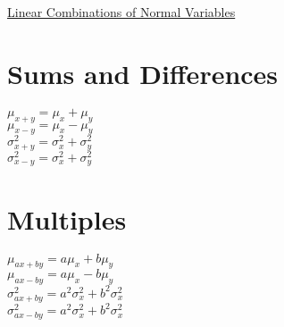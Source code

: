 \documentclass{article}[18pt]
\begin{document}
\begin{center}
\underline{\huge Linear Combinations of Normal Variables}
\end{center}
\section{Sums and Differences}
\Large{$\mu_{x+y}=\mu_x+\mu_y$}\\
\Large{$\mu_{x-y}=\mu_x-\mu_y$}\\
\Large{$\sigma^2_{x+y}=\sigma^2_x+\sigma^2_y$}\\
\Large{$\sigma^2_{x-y}=\sigma^2_x+\sigma^2_y$}\\
\section{Multiples}
$\mu_{ax+by}=a\mu_x+b\mu_y$\\
$\mu_{ax-by}=a\mu_x-b\mu_y$\\
$\sigma^2_{ax+by}=a^2\sigma^2_x+b^2\sigma^2_x$\\
$\sigma^2_{ax-by}=a^2\sigma^2_x+b^2\sigma^2_x$\\
\end{document}
